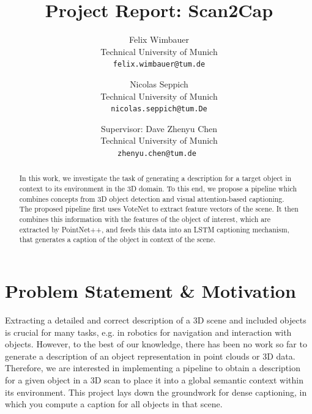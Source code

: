 \documentclass[10pt,twocolumn,letterpaper]{article}
\begin{document}
\title{Project Report: Scan2Cap}

\author{Felix Wimbauer\\
Technical University of Munich\\
{\tt\small felix.wimbauer@tum.de}
\and
Nicolas Seppich\\
Technical University of Munich\\
{\tt\small nicolas.seppich@tum.De}
\and
\small
Supervisor: Dave Zhenyu Chen\\
\small
Technical University of Munich\\
{\tt\small zhenyu.chen@tum.de }
}

\maketitle

\begin{abstract}
In this work, we investigate the task of generating a description for a target object in context to its environment in the 3D domain. To this end, we propose a pipeline which combines concepts from 3D object detection and visual attention-based captioning. The proposed pipeline first uses VoteNet to extract feature vectors of the scene. It then combines this information with the features of the object of interest, which are extracted by PointNet++, and feeds this data into an LSTM captioning mechanism, that generates a caption of the object in context of the scene.
   
\end{abstract}

\section{Problem Statement \& Motivation}

Extracting a detailed and correct description of a 3D scene and included objects is crucial for many tasks, e.g. in robotics for navigation and interaction with objects.
However, to the best of our knowledge, there has been no work so far to generate a description of an object representation in point clouds or 3D data. Therefore, we are interested in implementing a pipeline to obtain a description for a given object in a 3D scan to place it into a global semantic context within its environment. This project lays down the groundwork for dense captioning, in which you compute a caption for all objects in that scene.
 
\end{document}
